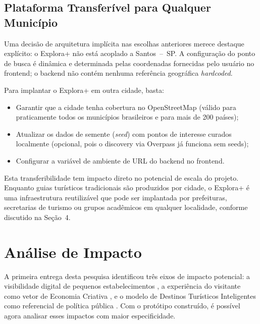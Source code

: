 \documentclass[12pt, a4paper]{article}
\begin{document}
\subsection{Plataforma Transfer\'ivel para Qualquer Munic\'ipio}

Uma decis\~ao de arquitetura impl\'icita nas escolhas anteriores merece destaque expl\'icito: o Explora+ n\~ao est\'a acoplado a Santos~--~SP. A configura\c{c}\~ao do ponto de busca \'e din\^amica e determinada pelas coordenadas fornecidas pelo usu\'ario no frontend; o backend n\~ao cont\'em nenhuma refer\^encia geogr\'afica \emph{hardcoded}.

Para implantar o Explora+ em outra cidade, basta:
\begin{itemize}
  \item Garantir que a cidade tenha cobertura no OpenStreetMap (v\'alido para praticamente todos os munic\'ipios brasileiros e para mais de 200 pa\'ises);
  \item Atualizar os dados de semente (\textit{seed}) com pontos de interesse curados localmente (opcional, pois o discovery via Overpass j\'a funciona sem seeds);
  \item Configurar a vari\'avel de ambiente de URL do backend no frontend.
\end{itemize}

Esta transferibilidade tem impacto direto no potencial de escala do projeto. Enquanto guias tur\'isticos tradicionais s\~ao produzidos por cidade, o Explora+ \'e uma infraestrutura reutiliz\'avel que pode ser implantada por prefeituras, secretarias de turismo ou grupos acad\^emicos em qualquer localidade, conforme discutido na Se\c{c}\~ao~4.

\clearpage
\section{An\'alise de Impacto}

A primeira entrega desta pesquisa identificou tr\^es eixos de impacto potencial: a visibilidade digital de pequenos estabelecimentos \parencite{luca2022,shankar2025}, a experi\^encia do visitante como vetor de Economia Criativa \parencite{silva2020,melo2022}, e o modelo de Destinos Tur\'isticos Inteligentes como referencial de pol\'itica p\'ublica \parencite{brasil2022}. Com o prot\'otipo constru\'ido, \'e poss\'ivel agora analisar esses impactos com maior especificidade.
\end{document}
